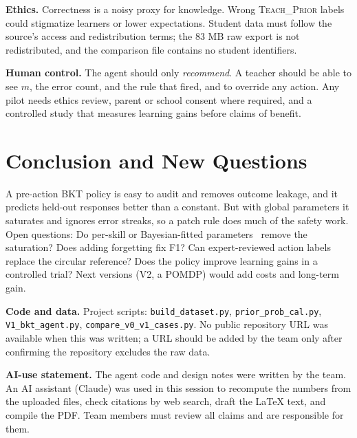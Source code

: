 \documentclass[10pt,twocolumn,letterpaper]{article}
\begin{document}
\textbf{Ethics.} Correctness is a noisy proxy for knowledge. Wrong \textsc{Teach\_Prior} labels could stigmatize learners or lower expectations. Student data must follow the source's access and redistribution terms; the 83 MB raw export is not redistributed, and the comparison file contains no student identifiers.

\textbf{Human control.} The agent should only \emph{recommend}. A teacher should be able to see $m$, the error count, and the rule that fired, and to override any action. Any pilot needs ethics review, parent or school consent where required, and a controlled study that measures learning gains before claims of benefit.

\section{Conclusion and New Questions}
A pre-action BKT policy is easy to audit and removes outcome leakage, and it predicts held-out responses better than a constant. But with global parameters it saturates and ignores error streaks, so a patch rule does much of the safety work. Open questions: Do per-skill or Bayesian-fitted parameters~\cite{pradhan2026,shchepakin2024} remove the saturation? Does adding forgetting fix F1? Can expert-reviewed action labels replace the circular reference? Does the policy improve learning gains in a controlled trial? Next versions (V2, a POMDP) would add costs and long-term gain.

\textbf{Code and data.} Project scripts: \texttt{build\_dataset.py}, \texttt{prior\_prob\_cal.py}, \texttt{V1\_bkt\_agent.py}, \texttt{compare\_v0\_v1\_cases.py}. No public repository URL was available when this was written; a URL should be added by the team only after confirming the repository excludes the raw data.

\textbf{AI-use statement.} The agent code and design notes were written by the team. An AI assistant (Claude) was used in this session to recompute the numbers from the uploaded files, check citations by web search, draft the LaTeX text, and compile the PDF. Team members must review all claims and are responsible for them.
\end{document}
